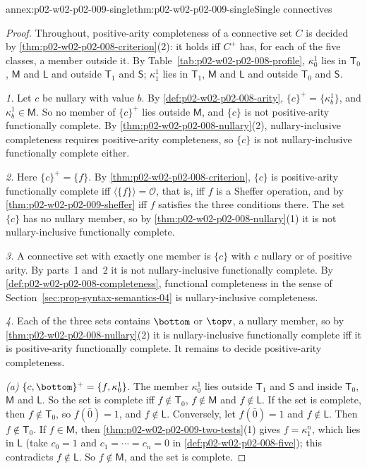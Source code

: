 \begin{annexitem}{annex:p02-w02-p02-009-single}{thm:p02-w02-p02-009-single}{Single connectives}
\begin{proof}
Throughout, positive-arity completeness of a connective set \(C\) is decided
by \cref{thm:p02-w02-p02-008-criterion}(2): it holds iff \(C^+\) has, for
each of the five classes, a member outside it.  By
Table~\ref{tab:p02-w02-p02-008-profile}, \(\kappa^1_0\) lies in
\(\mathsf T_0\), \(\mathsf M\) and \(\mathsf L\) and outside \(\mathsf T_1\)
and \(\mathsf S\); \(\kappa^1_1\) lies in \(\mathsf T_1\), \(\mathsf M\) and
\(\mathsf L\) and outside \(\mathsf T_0\) and \(\mathsf S\).

\emph{1.}  Let \(c\) be nullary with value \(b\).  By
\cref{def:p02-w02-p02-008-arity}, \(\{c\}^+=\{\kappa^1_b\}\), and
\(\kappa^1_b\in\mathsf M\).  So no member of \(\{c\}^+\) lies outside
\(\mathsf M\), and \(\{c\}\) is not positive-arity functionally complete.
By \cref{thm:p02-w02-p02-008-nullary}(2), nullary-inclusive completeness
requires positive-arity completeness, so \(\{c\}\) is not nullary-inclusive
functionally complete either.

\emph{2.}  Here \(\{c\}^+=\{f\}\).  By
\cref{thm:p02-w02-p02-008-criterion}, \(\{c\}\) is positive-arity
functionally complete iff \(\langle\{f\}\rangle=\mathcal O\), that is, iff
\(f\) is a Sheffer operation, and by \cref{thm:p02-w02-p02-009-sheffer} iff
\(f\) satisfies the three conditions there.  The set \(\{c\}\) has no
nullary member, so by \cref{thm:p02-w02-p02-008-nullary}(1) it is not
nullary-inclusive functionally complete.

\emph{3.}  A connective set with exactly one member is \(\{c\}\) with \(c\)
nullary or of positive arity.  By parts~1 and~2 it is not nullary-inclusive
functionally complete.  By \cref{def:p02-w02-p02-008-completeness},
functional completeness in the sense of
Section~\ref{sec:prop-syntax-semantics-04} is nullary-inclusive
completeness.

\emph{4.}  Each of the three sets contains \(\bottom\) or \(\topv\), a
nullary member, so by \cref{thm:p02-w02-p02-008-nullary}(2) it is
nullary-inclusive functionally complete iff it is positive-arity
functionally complete.  It remains to decide positive-arity completeness.

\emph{(a)}  \(\{c,\bottom\}^+=\{f,\kappa^1_0\}\).  The member
\(\kappa^1_0\) lies outside \(\mathsf T_1\) and \(\mathsf S\) and inside
\(\mathsf T_0\), \(\mathsf M\) and \(\mathsf L\).  So the set is complete iff
\(f\notin\mathsf T_0\), \(f\notin\mathsf M\) and \(f\notin\mathsf L\).  If
the set is complete, then \(f\notin\mathsf T_0\), so \(f(\bar0)=1\), and
\(f\notin\mathsf L\).  Conversely, let \(f(\bar0)=1\) and
\(f\notin\mathsf L\).  Then \(f\notin\mathsf T_0\).  If \(f\in\mathsf M\),
then \cref{thm:p02-w02-p02-009-two-tests}(1) gives \(f=\kappa^n_1\), which
lies in \(\mathsf L\) (take \(c_0=1\) and \(c_1=\cdots=c_n=0\) in
\cref{def:p02-w02-p02-008-five}); this contradicts \(f\notin\mathsf L\).  So
\(f\notin\mathsf M\), and the set is complete.


\end{proof}
\end{annexitem}
